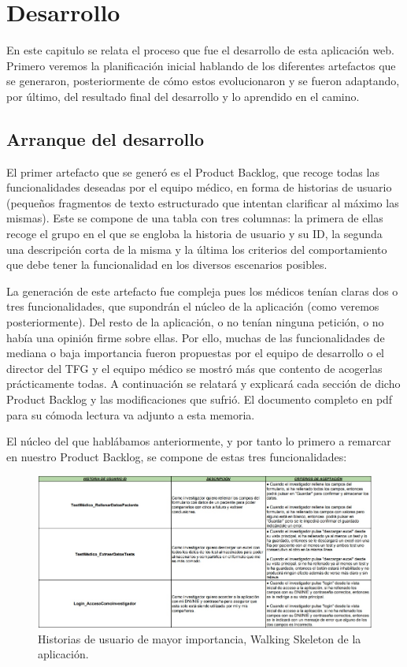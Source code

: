 \chapter{Desarrollo}

En este capitulo se relata el proceso que fue el desarrollo de esta aplicación web. Primero veremos la planificación inicial hablando de los diferentes artefactos que se generaron, posteriormente de cómo estos evolucionaron y se fueron adaptando, por último, del resultado final del desarrollo y lo aprendido en el camino.

\section{Arranque del desarrollo}

El primer artefacto que se generó es el Product Backlog, que recoge todas las funcionalidades deseadas por el equipo médico, en forma de historias de usuario (pequeños fragmentos de texto estructurado que intentan clarificar al máximo las mismas). Este se compone de una tabla con tres columnas: la primera de ellas recoge el grupo en el que se engloba la historia de usuario y su ID, la segunda una descripción corta de la misma y la última los criterios del comportamiento que debe tener la funcionalidad en los diversos escenarios posibles.
\newline

La generación de este artefacto fue compleja pues los médicos tenían claras dos o tres funcionalidades, que supondrán el núcleo de la aplicación (como veremos posteriormente). Del resto de la aplicación, o no tenían ninguna petición, o no había una opinión firme sobre ellas. Por ello, muchas de las funcionalidades de mediana o baja importancia fueron propuestas por el equipo de desarrollo o el director del TFG y el equipo médico se mostró más que contento de acogerlas prácticamente todas. A continuación se relatará y explicará cada sección de dicho Product Backlog y las modificaciones que sufrió. El documento completo en pdf para su cómoda lectura va adjunto a esta memoria.
\newpage

El núcleo del que hablábamos anteriormente, y por tanto lo primero a remarcar en nuestro Product Backlog, se compone de estas tres funcionalidades:
\newline

 \begin{figure}[h]
    \centering
     \includegraphics[width=1\textwidth]{images/historiasUsuario-1.jpg}
    \caption{Historias de usuario de mayor importancia, Walking Skeleton de la aplicación.}
\end{figure}


